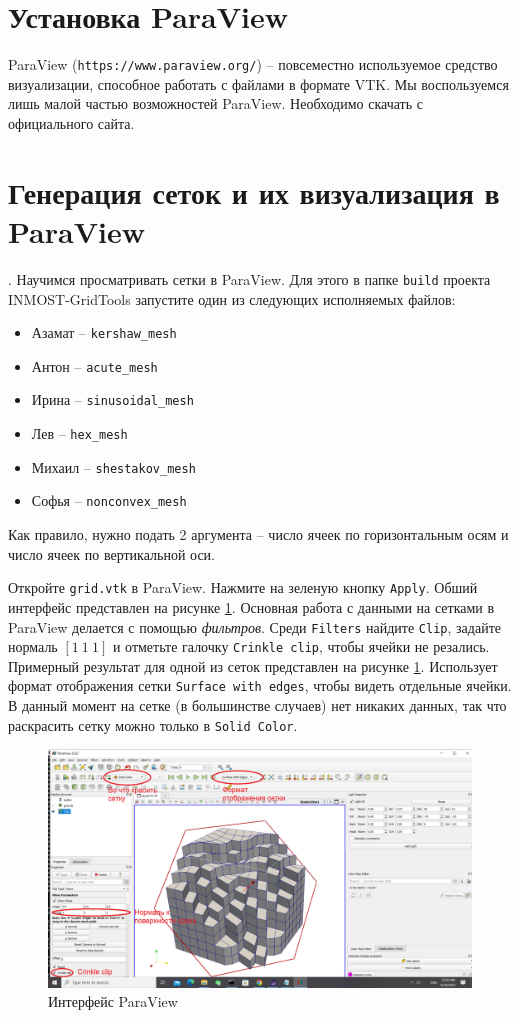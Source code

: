 \documentclass[a4paper, 11pt]{article}
\begin{document}
\section{Установка ParaView}
ParaView (\texttt{https://www.paraview.org/}) -- повсеместно используемое средство визуализации, способное работать с файлами в формате VTK. Мы воспользуемся лишь малой частью возможностей ParaView. Необходимо скачать с официального сайта.

\section{Генерация сеток и их визуализация в ParaView}.
Научимся просматривать сетки в ParaView. Для этого в папке \texttt{build} проекта INMOST-GridTools запустите один из следующих исполняемых файлов:
\begin{itemize}
	\item Азамат -- \texttt{kershaw\_mesh}
	\item Антон -- \texttt{acute\_mesh}
	\item Ирина -- \texttt{sinusoidal\_mesh}
	\item Лев -- \texttt{hex\_mesh}
	\item Михаил -- \texttt{shestakov\_mesh}
	\item Софья -- \texttt{nonconvex\_mesh}
\end{itemize}
Как правило, нужно подать 2 аргумента -- число ячеек по горизонтальным осям и число ячеек по вертикальной оси.

Откройте \texttt{grid.vtk} в ParaView. Нажмите на зеленую кнопку \texttt{Apply}. Обший интерфейс представлен на рисунке \ref{fig:pv_gui}. Основная работа с данными на сетками в ParaView делается с помощью \textit{фильтров}. Среди \texttt{Filters} найдите \texttt{Clip}, задайте нормаль $[1~1~1]$ и отметьте галочку \texttt{Crinkle clip}, чтобы ячейки не резались. Примерный результат для одной из сеток представлен на рисунке \ref{fig:pv_gui}. Использует формат отображения сетки \texttt{Surface with edges}, чтобы видеть отдельные ячейки. В данный момент на сетке (в большинстве случаев) нет никаких данных, так что раскрасить сетку можно только в \texttt{Solid Color}.

\begin{figure}[h] \centering
		\includegraphics[scale=0.4]{pv_gui.png}
	\caption{Интерфейс ParaView\label{fig:pv_gui}}
\end{figure}
\end{document}
